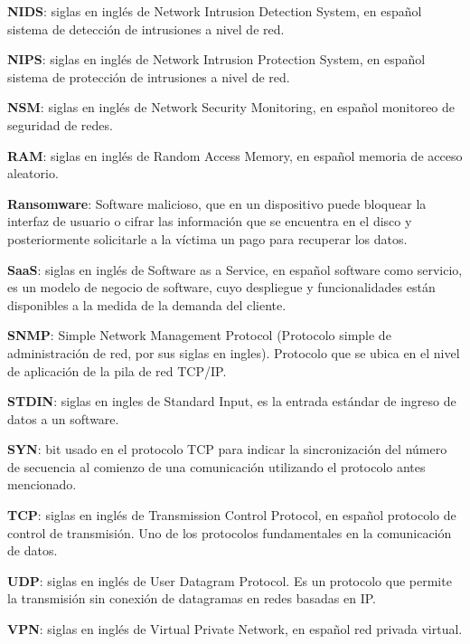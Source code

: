 \textbf{NIDS}: siglas en inglés de Network Intrusion Detection System, en español sistema de detección de intrusiones a nivel de red. \par

\textbf{NIPS}: siglas en inglés de Network Intrusion Protection System, en español sistema de protección de intrusiones a nivel de red. \par

\textbf{NSM}: siglas en inglés de Network Security Monitoring, en español monitoreo de seguridad de redes. \par

\textbf{RAM}: siglas en inglés de Random Access Memory, en español memoria de acceso aleatorio. \par

\textbf{Ransomware}: Software malicioso, que en un dispositivo puede bloquear la interfaz de usuario o cifrar las información que se encuentra en el disco y posteriormente solicitarle a la víctima un pago para recuperar los datos. \par

\textbf{SaaS}: siglas en inglés de Software as a Service, en español software como servicio, es un modelo de negocio de software, cuyo despliegue y funcionalidades están disponibles a la medida de la demanda del cliente. \par

\textbf{SNMP}: Simple Network Management Protocol (Protocolo simple de administración de red, por sus siglas en ingles). Protocolo que se ubica en el nivel de aplicación de la pila de red TCP/IP.  \par

\textbf{STDIN}: siglas en ingles de Standard Input, es la entrada estándar de ingreso de datos a un software.\par

\textbf{SYN}: bit usado en el protocolo TCP para indicar la sincronización del número de secuencia al comienzo de una comunicación utilizando el protocolo antes mencionado. \par

\textbf{TCP}: siglas en inglés de Transmission Control Protocol, en español protocolo de control de transmisión. Uno de los protocolos fundamentales en la comunicación de datos. \par

\textbf{UDP}: siglas en inglés de User Datagram Protocol. Es un protocolo que permite la transmisión sin conexión de datagramas en redes basadas en IP. \par

\textbf{VPN}: siglas en inglés de Virtual Private Network, en español red privada virtual. \par
